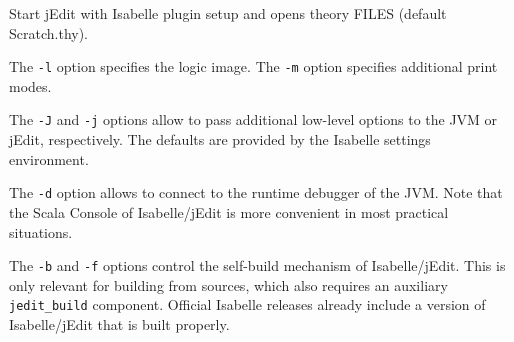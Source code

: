 \begin{isabellebody}
\begin{isamarkuptext}
\begin{ttbox}
Start jEdit with Isabelle plugin setup and opens theory FILES
(default Scratch.thy).
\end{ttbox}

The \verb|-l| option specifies the logic image.  The
\verb|-m| option specifies additional print modes.

The \verb|-J| and \verb|-j| options allow to pass
additional low-level options to the JVM or jEdit, respectively.  The
defaults are provided by the Isabelle settings environment.

The \verb|-d| option allows to connect to the runtime debugger
of the JVM.  Note that the Scala Console of Isabelle/jEdit is more
convenient in most practical situations.

The \verb|-b| and \verb|-f| options control the
self-build mechanism of Isabelle/jEdit.  This is only relevant for
building from sources, which also requires an auxiliary \verb|jedit_build| component.  Official Isabelle releases already include a
version of Isabelle/jEdit that is built properly.%
\end{isamarkuptext}%
\isamarkuptrue%
%
\isadelimtheory
%
\endisadelimtheory
%
\isatagtheory
{}\isamarkupfalse%
%
\endisatagtheory
{\isafoldtheory}%
%
\isadelimtheory
%
\endisadelimtheory
\end{isabellebody}%
